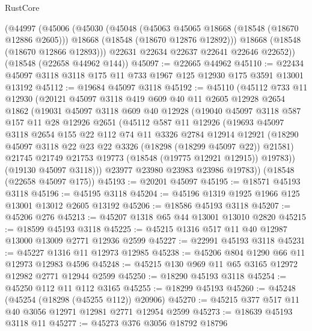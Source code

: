 \begin{lexlean}{RustCore}
\begin{coremodule}
    (@44997
      (@45006
        (@45030
          (@45048
            (@45063 @45065 @18668 (@18548 (@18670 @12886 @2605)))
            @18668
            (@18548 (@18670 @12876 @12892)))
          @18668
          (@18548 (@18670 @12866 @12893)))
        @22631
        @22634
        @22637
        @22641
        @22646
        @22652))
    (@18548 (@22658 @44962 @144))
@45097 := @22665 @44962
@45110 := @22434 @45097 @3118 @3118 @175 @11 @733 @1967 @125 @12930 @175 @3591 @13001 @13192
@45112 := @19684 @45097 @3118
@45192 := @45110
    (@45112
      @733
      @11
      @12930
      (@20121
        @45097
        @3118
        @419
        @609
        @40
        @11
        @2605
        @12928
        @2654
        @1862
        (@19031
          @45097
          @3118
          @609
          @40
          @12928
          (@19040
            @45097
            @3118
            @587
            @157
            @11
            @28
            @12926
            @2651
            (@45112
              @587
              @11
              @12926
              (@19693
                @45097
                @3118
                @2654
                @155
                @22
                @112
                @74
                @11
                @3326
                @2784
                @12914
                @12921
                (@18290 @45097 @3118 @22 @23 @22 @3326 (@18298 (@18299 @45097 @22)) @21581)
                @21745
                @21749
                @21753
                @19773
                (@18548 (@19775 @12921 @12915))
                @19783))
            (@19130 @45097 @3118)))
        @23977
        @23980
        @23983
        @23986
        @19783))
    (@18548 (@22658 @45097 @175))
@45193 := @20201 @45097
@45195 := @18571 @45193 @3118
@45196 := @45195 @3118
@45204 := @45196 @1319 @1925 @1966 @125 @13001 @13012 @2605 @13192
@45206 := @18586 @45193 @3118
@45207 := @45206 @276
@45213 := @45207 @1318 @65 @44 @13001 @13010 @2820
@45215 := @18599 @45193 @3118
@45225 := @45215 @1316 @517 @11 @40 @12987 @13000 @13009 @2771 @12936 @2599
@45227 := @22991 @45193 @3118
@45231 := @45227 @1316 @11 @12973 @12985
@45238 := @45206 @804 @1290 @66 @11 @12973 @12983 @4596
@45248 := @45215 @130 @969 @11 @65 @3165 @12972 @12982 @2771 @12944 @2599
@45250 := @18290 @45193 @3118
@45254 := @45250 @112 @11 @112 @3165
@45255 := @18299 @45193
@45260 := @45248 (@45254 (@18298 (@45255 @112)) @20906)
@45270 := @45215 @377 @517 @11 @40 @3056 @12971 @12981 @2771 @12954 @2599
@45273 := @18639 @45193 @3118 @11
@45277 := @45273 @376 @3056 @18792 @18796

\end{coremodule}
\end{lexlean}
